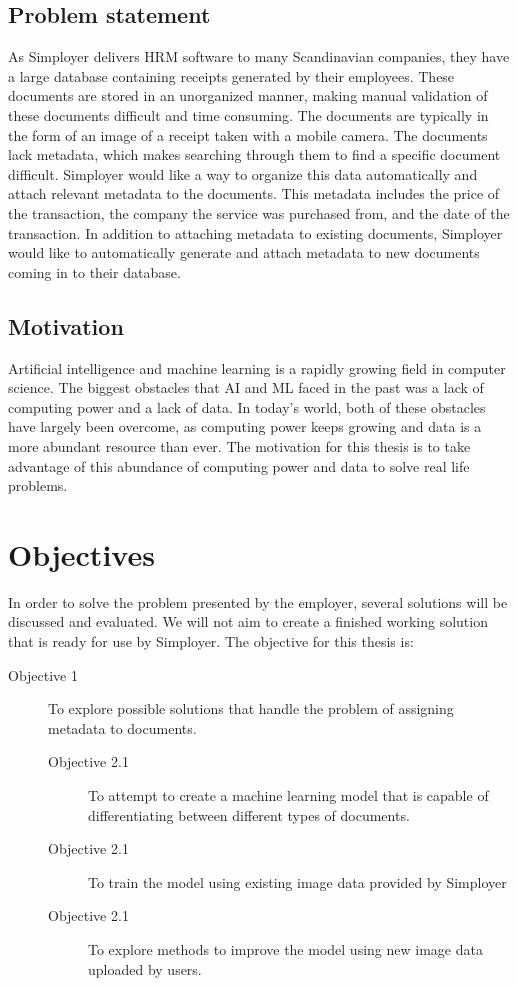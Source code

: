 \subsection{Problem statement}\label{subsec:problem-statement}
As Simployer delivers HRM software to many Scandinavian companies, they have a large database containing receipts generated by their employees.
These documents are stored in an unorganized manner, making manual validation of these documents difficult and time consuming.
The documents are typically in the form of an image of a receipt taken with a mobile camera.
The documents lack metadata, which makes searching through them to find a specific document difficult.
Simployer would like a way to organize this data automatically and attach relevant metadata to the documents.
This metadata includes the price of the transaction, the company the service was purchased from, and the date of the transaction.
In addition to attaching metadata to existing documents, Simployer would like to automatically generate and attach metadata to new documents coming in to their database.

\subsection{Motivation}\label{subsec:motivation}
Artificial intelligence and machine learning is a rapidly growing field in computer science.
The biggest obstacles that AI and ML faced in the past was a lack of computing power and a lack of data.
In today's world, both of these obstacles have largely been overcome, as computing power keeps growing and data is a more abundant resource than ever.
The motivation for this thesis is to take advantage of this abundance of computing power and data to solve real life problems.

\section{Objectives}\label{sec:objectives}
In order to solve the problem presented by the employer, several solutions will be discussed and evaluated.
We will not aim to create a finished working solution that is ready for use by Simployer.
The objective for this thesis is:
\begin{description}
    \item[Objective 1] To explore possible solutions that handle the problem of assigning metadata to documents.
    \begin{description}
        \item[Objective 2.1] To attempt to create a machine learning model that is capable of differentiating between different types of documents.
        \item[Objective 2.1] To train the model using existing image data provided by Simployer
        \item[Objective 2.1] To explore methods to improve the model using new image data uploaded by users.
    \end{description}

\end{description}

